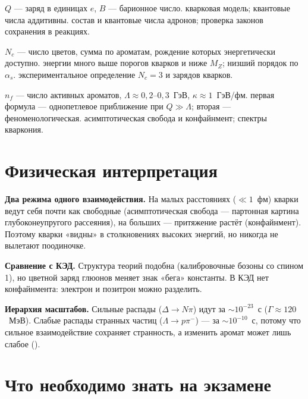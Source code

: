  {$Q$ — заряд в единицах $e$, $B$ — барионное число.}
 {кварковая модель; квантовые числа аддитивны.}
 {состав и квантовые числа адронов; проверка законов сохранения в реакциях.}

 {$N_c$ — число цветов, сумма по ароматам, рождение которых энергетически доступно.}
 {энергии много выше порогов кварков и ниже $M_Z$; низший порядок по $\alpha_s$.}
 {экспериментальное определение $N_c=3$ и зарядов кварков.}

 {$n_f$ — число активных ароматов, $\Lambda\approx0{,}2$--$0{,}3$~ГэВ, $\kappa\approx1$~ГэВ/фм.}
 {первая формула — однопетлевое приближение при $Q\gg\Lambda$; вторая — феноменологическая.}
 {асимптотическая свобода и конфайнмент; спектры кваркония.}

\section{Физическая интерпретация}

\textbf{Два режима одного взаимодействия.} На малых расстояниях ($\ll1$~фм) кварки ведут себя почти как свободные
(асимптотическая свобода — партонная картина глубоконеупругого рассеяния), на больших — притяжение растёт
(конфайнмент). Поэтому кварки «видны» в столкновениях высоких энергий, но никогда не вылетают поодиночке.

\textbf{Сравнение с КЭД.} Структура теорий подобна (калибровочные бозоны со спином 1), но цветной заряд глюонов
меняет знак «бега» константы. В КЭД нет конфайнмента: электрон и позитрон можно разделить.

\textbf{Иерархия масштабов.} Сильные распады ($\Delta\to N\pi$) идут за $\sim10^{-23}$~с ($\Gamma\approx120$~МэВ). Слабые распады
странных частиц ($\Lambda\to p\pi^-$) — за $\sim10^{-10}$~с, потому что сильное взаимодействие сохраняет странность, а
изменить аромат может лишь слабое ().

\section{Что необходимо знать на экзамене}

